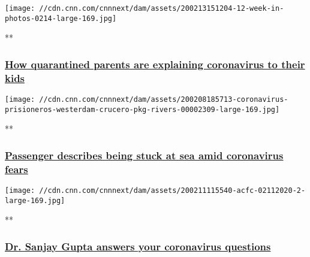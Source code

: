 \href{/videos/world/2020/02/13/japan-ship-quarantined-coronavirus-ripley-acfc-full-episode-vpx.cnn/video/playlists/acfc-full-episodes/}{}

\texttt{[image: //cdn.cnn.com/cnnnext/dam/assets/200213151204-12-week-in-photos-0214-large-169.jpg]}

**

\hypertarget{how-quarantined-parents-are-explaining-coronavirus-to-their-kids}{%
\subsubsection{\texorpdfstring{\href{/videos/world/2020/02/13/japan-ship-quarantined-coronavirus-ripley-acfc-full-episode-vpx.cnn/video/playlists/acfc-full-episodes/}{How
quarantined parents are explaining coronavirus to their
kids}}{How quarantined parents are explaining coronavirus to their kids}}\label{how-quarantined-parents-are-explaining-coronavirus-to-their-kids}}

\href{/videos/world/2020/02/12/cruise-ship-passenger-coronavirus-acfc-full-episode-vpx.cnn/video/playlists/acfc-full-episodes/}{}

\texttt{[image: //cdn.cnn.com/cnnnext/dam/assets/200208185713-coronavirus-prisioneros-westerdam-crucero-pkg-rivers-00002309-large-169.jpg]}

**

\hypertarget{passenger-describes-being-stuck-at-sea-amid-coronavirus-fears-}{%
\subsubsection{\texorpdfstring{\href{/videos/world/2020/02/12/cruise-ship-passenger-coronavirus-acfc-full-episode-vpx.cnn/video/playlists/acfc-full-episodes/}{Passenger
describes being stuck at sea amid coronavirus fears
}}{Passenger describes being stuck at sea amid coronavirus fears }}\label{passenger-describes-being-stuck-at-sea-amid-coronavirus-fears-}}

\href{/videos/world/2020/02/11/coronavirus-questions-sanjay-gupta-acfc-full-episode-vpx.cnn/video/playlists/acfc-full-episodes/}{}

\texttt{[image: //cdn.cnn.com/cnnnext/dam/assets/200211115540-acfc-02112020-2-large-169.jpg]}

**

\hypertarget{dr-sanjay-gupta-answers-your-coronavirus-questions}{%
\subsubsection{\texorpdfstring{\href{/videos/world/2020/02/11/coronavirus-questions-sanjay-gupta-acfc-full-episode-vpx.cnn/video/playlists/acfc-full-episodes/}{Dr.
Sanjay Gupta answers your coronavirus
questions}}{Dr. Sanjay Gupta answers your coronavirus questions}}\label{dr-sanjay-gupta-answers-your-coronavirus-questions}}

